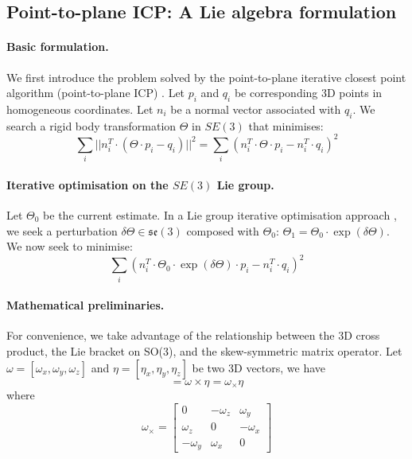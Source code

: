 \subsection{Point-to-plane ICP: A Lie algebra formulation}
\label{in:sec:p2plane}

\paragraph{Basic formulation.}
We first introduce the problem solved by the point-to-plane iterative closest point algorithm (point-to-plane ICP) \cite{Rusinkiewicz:IC3DIM:2001}.
Let $p_i$ and $q_i$ be corresponding 3D points in homogeneous coordinates. Let $n_i$ be a normal vector associated with $q_i$. We search a rigid body transformation $\Theta$ in $SE(3)$ that minimises:
\begin{equation}
\sum_i ||n_i^T \cdot (\Theta \cdot p_i - q_i)||^2 = \sum_i (n_i^T \cdot \Theta \cdot p_i - n_i^T \cdot q_i)^2
\end{equation}

\paragraph{Iterative optimisation on the $SE(3)$ Lie group.}
Let $\Theta_0$ be the current estimate. In a Lie group iterative optimisation approach \cite{Mahony:JGO:2002,Vercauteren:IPMI:2007}, we seek a perturbation $\delta\Theta \in \mathfrak{se}(3)$ composed with
$\Theta_0$: $\Theta_1 = \Theta_0 \cdot \exp(\delta\Theta)$. We now seek to minimise:
\begin{equation}
\sum_i (n_i^T \cdot \Theta_0 \cdot \exp(\delta\Theta) \cdot p_i - n_i^T \cdot q_i)^2
\end{equation}

\paragraph{Mathematical preliminaries.}
For convenience, we take advantage of the relationship between the 3D cross product, the Lie bracket on SO(3), and the skew-symmetric matrix operator.
Let $\omega = [\omega_x, \omega_y, \omega_z]$ and $\eta = [\eta_x, \eta_y, \eta_z]$ be two 3D vectors, we have
\begin{equation}
[\omega, \eta] = \omega \times \eta = \omega_\times \eta
\end{equation}
where
\begin{equation}
\omega_\times =
\begin{bmatrix}
0         & -\omega_z & \omega_y \\
\omega_z  & 0         & -\omega_x \\
-\omega_y & \omega_x  & 0
\end{bmatrix}
\end{equation}

